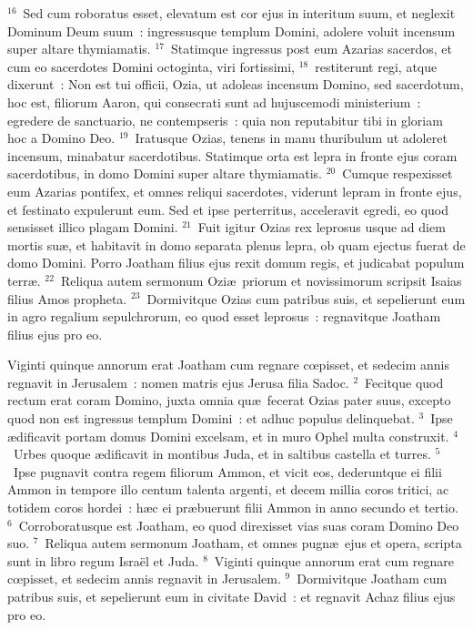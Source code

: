 ${}^{16}$~Sed cum roboratus esset, elevatum est cor ejus in interitum suum, et neglexit Dominum Deum suum~: ingressusque templum Domini, adolere voluit incensum super altare thymiamatis.
${}^{17}$~Statimque ingressus post eum Azarias sacerdos, et cum eo sacerdotes Domini octoginta, viri fortissimi,
${}^{18}$~restiterunt regi, atque dixerunt~: Non est tui officii, Ozia, ut adoleas incensum Domino, sed sacerdotum, hoc est, filiorum Aaron, qui consecrati sunt ad hujuscemodi ministerium~: egredere de sanctuario, ne contempseris~: quia non reputabitur tibi in gloriam hoc a Domino Deo.
${}^{19}$~Iratusque Ozias, tenens in manu thuribulum ut adoleret incensum, minabatur sacerdotibus. Statimque orta est lepra in fronte ejus coram sacerdotibus, in domo Domini super altare thymiamatis.
${}^{20}$~Cumque respexisset eum Azarias pontifex, et omnes reliqui sacerdotes, viderunt lepram in fronte ejus, et festinato expulerunt eum. Sed et ipse perterritus, acceleravit egredi, eo quod sensisset illico plagam Domini.
${}^{21}$~Fuit igitur Ozias rex leprosus usque ad diem mortis su\ae , et habitavit in domo separata plenus lepra, ob quam ejectus fuerat de domo Domini. Porro Joatham filius ejus rexit domum regis, et judicabat populum terr\ae .
${}^{22}$~Reliqua autem sermonum Ozi\ae\ priorum et novissimorum scripsit Isaias filius Amos propheta.
${}^{23}$~Dormivitque Ozias cum patribus suis, et sepelierunt eum in agro regalium sepulchrorum, eo quod esset leprosus~: regnavitque Joatham filius ejus pro eo.

\bchapter
\lettrine[lines=3,image=true,loversize=0.05,lraise=-0.03]{V}{}iginti quinque annorum erat Joatham cum regnare cœpisset, et sedecim annis regnavit in Jerusalem~: nomen matris ejus Jerusa filia Sadoc.
${}^{2}$~Fecitque quod rectum erat coram Domino, juxta omnia qu\ae\ fecerat Ozias pater suus, excepto quod non est ingressus templum Domini~: et adhuc populus delinquebat.
${}^{3}$~Ipse \ae dificavit portam domus Domini excelsam, et in muro Ophel multa construxit.
${}^{4}$~Urbes quoque \ae dificavit in montibus Juda, et in saltibus castella et turres.
${}^{5}$~Ipse pugnavit contra regem filiorum Ammon, et vicit eos, dederuntque ei filii Ammon in tempore illo centum talenta argenti, et decem millia coros tritici, ac totidem coros hordei~: h\ae c ei pr\ae buerunt filii Ammon in anno secundo et tertio.
${}^{6}$~Corroboratusque est Joatham, eo quod direxisset vias suas coram Domino Deo suo.
${}^{7}$~Reliqua autem sermonum Joatham, et omnes pugn\ae\ ejus et opera, scripta sunt in libro regum Isra\"el et Juda.
${}^{8}$~Viginti quinque annorum erat cum regnare cœpisset, et sedecim annis regnavit in Jerusalem.
${}^{9}$~Dormivitque Joatham cum patribus suis, et sepelierunt eum in civitate David~: et regnavit Achaz filius ejus pro eo.


